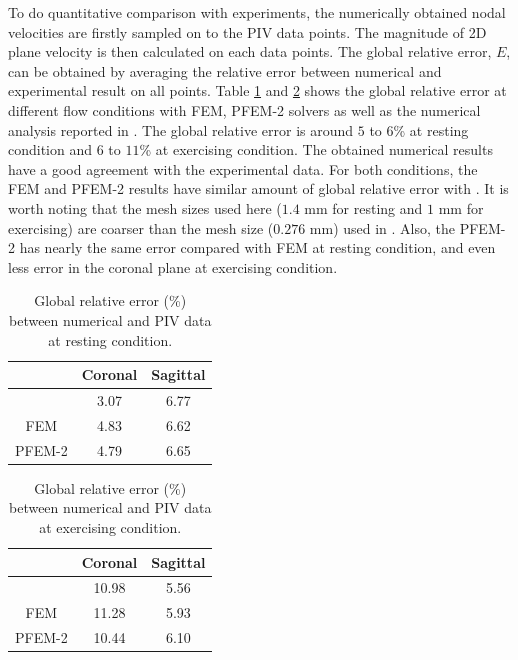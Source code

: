 To do quantitative comparison with experiments, the numerically obtained nodal velocities are firstly sampled on to the PIV data points. The magnitude of 2D plane velocity is then calculated on each data points. The global relative error, $E$, can be obtained by averaging the relative error between numerical and experimental result on all points. Table \ref{tab:rest} and \ref{tab:exercise} shows the global relative error at different flow conditions with FEM, PFEM-2 solvers as well as the numerical analysis reported in \cite{craven_cfd}. The global relative error is around $5$ to $6$\% at resting condition and $6$ to $11$\% at exercising condition. The obtained numerical results have a good agreement with the experimental data. For both conditions, the FEM and PFEM-2 results have similar amount of global relative error with \cite{craven_cfd}. It is worth noting that the mesh sizes used here ($1.4$ mm for resting and $1$ mm for exercising) are coarser than the mesh size ($0.276$ mm) used in \cite{craven_cfd}. Also, the PFEM-2 has nearly the same error compared with FEM at resting condition, and even less error in the coronal plane at exercising condition.

\begin{table}[h!]
\caption {Global relative error (\%) between numerical and PIV data at resting condition.} \label{tab:rest}
\centering
\begin{tabular}{|c|c|c|}
\hline
       & Coronal & Sagittal \\ \hline
\cite{craven_cfd}  & 3.07    & 6.77     \\ \hline
FEM    & 4.83    & 6.62     \\ \hline
PFEM-2 & 4.79    & 6.65     \\ \hline
\end{tabular}
\end{table}

\begin{table}[h!]
\caption {Global relative error (\%) between numerical and PIV data at exercising condition.} \label{tab:exercise}
\centering
\begin{tabular}{|c|c|c|}
\hline
       & Coronal & Sagittal \\ \hline
\cite{craven_cfd}  & 10.98	&5.56 \\ \hline
FEM    &  11.28    &  5.93  \\ \hline
PFEM-2 &  10.44   &  6.10     \\ \hline
\end{tabular}
\end{table}
